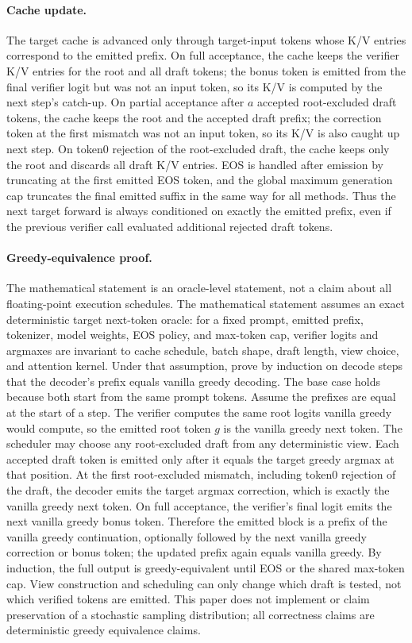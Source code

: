 \documentclass[11pt,a4paper]{article}
\begin{document}
\paragraph{Cache update.}
The target cache is advanced only through target-input tokens whose K/V
entries correspond to the emitted prefix. On full acceptance, the cache
keeps the verifier K/V entries for the root and all draft tokens; the
bonus token is emitted from the final verifier logit but was not an input
token, so its K/V is computed by the next step's catch-up. On partial
acceptance after $a$ accepted root-excluded draft tokens, the cache keeps
the root and the accepted draft prefix; the correction token at the first
mismatch was not an input token, so its K/V is also caught up next step.
On token0 rejection of the root-excluded draft, the cache keeps only the
root and discards all draft K/V entries. EOS is handled after emission by
truncating at the first emitted EOS token, and the global maximum
generation cap truncates the final emitted suffix in the same way for all
methods. Thus the next target forward is always conditioned on exactly the
emitted prefix, even if the previous verifier call evaluated additional
rejected draft tokens.

\paragraph{Greedy-equivalence proof.}
The mathematical statement is an oracle-level statement, not a claim about all
floating-point execution schedules.
The mathematical statement assumes an exact deterministic target next-token
oracle: for a fixed prompt, emitted prefix, tokenizer, model weights, EOS
policy, and max-token cap, verifier logits and argmaxes are invariant to cache
schedule, batch shape, draft length, view choice, and attention kernel. Under
that assumption, prove by induction on decode steps that the decoder's prefix
equals vanilla greedy decoding. The base case holds because both start from
the same prompt tokens. Assume the prefixes are equal at the start of a step.
The verifier computes the same root logits vanilla greedy would compute, so
the emitted root token $g$ is the vanilla greedy next token. The scheduler may
choose any root-excluded draft from any deterministic view. Each accepted draft
token is emitted only after it equals the target greedy argmax at that
position. At the first root-excluded mismatch, including token0 rejection of
the draft, the decoder emits the target argmax correction, which is exactly the
vanilla greedy next token. On full acceptance, the verifier's final logit emits
the next vanilla greedy bonus token. Therefore the emitted block is a prefix of
the vanilla greedy continuation, optionally followed by the next vanilla greedy
correction or bonus token; the updated prefix again equals vanilla greedy. By
induction, the full output is greedy-equivalent until EOS or the shared
max-token cap. View construction and scheduling can only change which draft is
tested, not which verified tokens are emitted.
This paper does not implement or claim preservation of a stochastic
sampling distribution; all correctness claims are deterministic greedy
equivalence claims.
\end{document}
